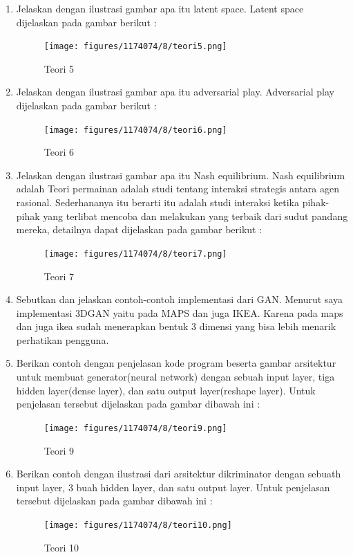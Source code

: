 \begin{enumerate}
    \item Jelaskan dengan ilustrasi gambar apa itu latent space.
	\hfill\break
    Latent space dijelaskan pada gambar berikut :
    \begin{figure}[H]
		\texttt{[image: figures/1174074/8/teori5.png]}
		\centering
		\caption{Teori 5}
    \end{figure}

    \item Jelaskan dengan ilustrasi gambar apa itu adversarial play.
	\hfill\break
    Adversarial play dijelaskan pada gambar berikut :
    \begin{figure}[H]
		\texttt{[image: figures/1174074/8/teori6.png]}
		\centering
		\caption{Teori 6}
    \end{figure}

    \item Jelaskan dengan ilustrasi gambar apa itu Nash equilibrium.
	\hfill\break
	Nash equilibrium adalah Teori permainan adalah studi tentang interaksi strategis antara agen rasional. Sederhananya itu berarti itu adalah studi interaksi ketika pihak-pihak yang terlibat mencoba dan melakukan yang terbaik dari sudut pandang mereka, detailnya dapat dijelaskan pada gambar berikut : 
    \begin{figure}[H]
		\texttt{[image: figures/1174074/8/teori7.png]}
		\centering
		\caption{Teori 7}
    \end{figure}

    \item Sebutkan dan jelaskan contoh-contoh implementasi dari GAN.
	\hfill\break
	Menurut saya implementasi 3DGAN yaitu pada MAPS dan juga IKEA. Karena pada maps dan juga ikea sudah menerapkan bentuk 3 dimensi yang bisa lebih menarik perhatikan pengguna.

    \item Berikan contoh dengan penjelasan kode program beserta gambar arsitektur untuk membuat generator(neural network) dengan sebuah input layer, tiga hidden layer(dense layer), dan satu output layer(reshape layer).
	\hfill\break
    Untuk penjelasan tersebut dijelaskan pada gambar dibawah ini :
    \begin{figure}[H]
		\texttt{[image: figures/1174074/8/teori9.png]}
		\centering
		\caption{Teori 9}
    \end{figure}

    \item Berikan contoh dengan ilustrasi dari arsitektur dikriminator dengan sebuath input layer, 3 buah hidden layer, dan satu output layer.
	\hfill\break
    Untuk penjelasan tersebut dijelaskan pada gambar dibawah ini :
    \begin{figure}[H]
		\texttt{[image: figures/1174074/8/teori10.png]}
		\centering
		\caption{Teori 10}
    \end{figure}


\end{enumerate}
